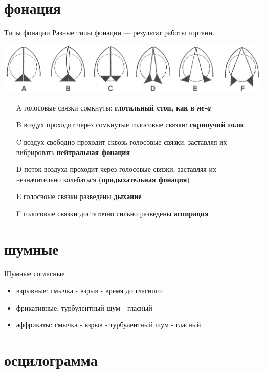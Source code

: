 \section{фонация}
\begin{frame}{Типы фонации}
Разные типы фонации --- результат \href{https://www.youtube.com/watch?v=b89RSYCaUBo}{работы гортани}.

\includegraphics[width=\linewidth]{11-glottis-positions.png}

\begin{itemize}
\item[A] голосовые связки сомкнуты: \textbf{глотальный стоп, как в \textit{не-а}}
\item[B] воздух проходит через сомкнутые голосовые связки: \textbf{скрипучий голос}
\item[C]  воздух свободно проходит сквозь голосовые связки, заставляя их вибрировать \textbf{нейтральная фонация}
\item[D] поток воздуха проходит через голосовые связки, заставляя их незначительно колебаться (\textbf{придыхательная фонация})
\item[E]  голосвоые связки разведены \textbf{дыхание}
\item[F] голосовые связки достаточно сильно разведены \textbf{аспирация}
\end{itemize}
\end{frame}

\section{шумные}
\begin{frame}{Шумные согласные}
\begin{itemize}
\item взрывные: смычка - взрыв - время до гласного
\item фрикативные: турбулентный шум - гласный
\item аффрикаты: смычка - взрыв - турбулентный шум - гласный
\end{itemize}
\end{frame}

\section{осцилограмма}

